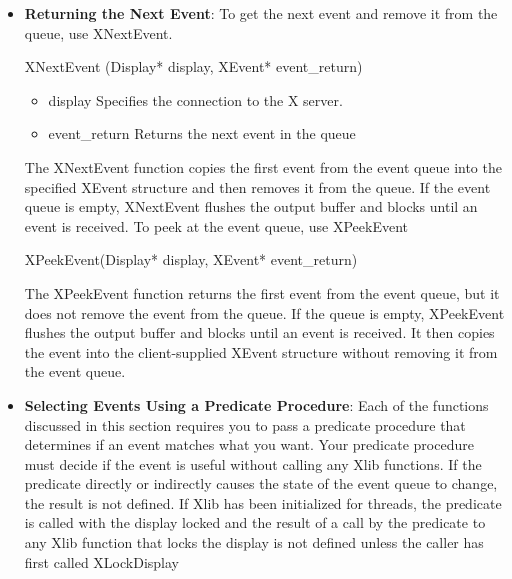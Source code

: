 \documentclass{report}
\begin{document}
\begin{itemize}
\begin{cppcode}
{                    XKeyEvent           xkey;
                    XButtonEvent        xbutton;
                    XMotionEvent        xmotion;
                    XExposeEvent        xexpose;
                    XConfigureEvent     xconfigure;
                    XMapEvent           xmap;
                    XMapRequestEvent    xmaprequest;
                    XDestroyWindowEvent xdestroywindow;

                    /* many more event-specific structures */
                } XEvent;
            \end{cppcode}
        \item \textbf{Returning the Next Event}: To get the next event and remove it from the queue, use XNextEvent.
            \bigbreak \noindent 
            \begin{cppcode}
            XNextEvent (Display* display, XEvent* event_return)
            \end{cppcode}
            \bigbreak \noindent
            \begin{itemize}
                \item display Specifies the connection to the X server.
                \item event\_return Returns the next event in the queue
            \end{itemize}
            The XNextEvent function copies the first event from the event queue into the specified XEvent structure and then removes it from the queue. If the event queue is empty, XNextEvent flushes the output buffer and blocks until an event is received.
            \bigbreak \noindent 
            To peek at the event queue, use XPeekEvent
            \bigbreak \noindent 
            \begin{cppcode}
            XPeekEvent(Display* display, XEvent* event_return)
            \end{cppcode}
            \bigbreak \noindent 
            The XPeekEvent function returns the first event from the event queue, but it does not remove the event from the queue. If the queue is empty, XPeekEvent flushes the output buffer and blocks until an event is received. It then copies the event into the client-supplied XEvent structure without removing it from the event queue.
        \item \textbf{Selecting Events Using a Predicate Procedure}: Each of the functions discussed in this section requires you to pass a predicate procedure that determines if an event matches what you want. Your predicate procedure must decide if the event is useful without calling any Xlib functions. If the predicate directly or indirectly causes the state of the event queue to change, the result is not defined. If Xlib has been initialized for threads, the predicate is called with the display locked and the result of a call by the predicate to any Xlib function that locks the display is not defined unless the caller has first called XLockDisplay

\end{itemize}
\end{document}
